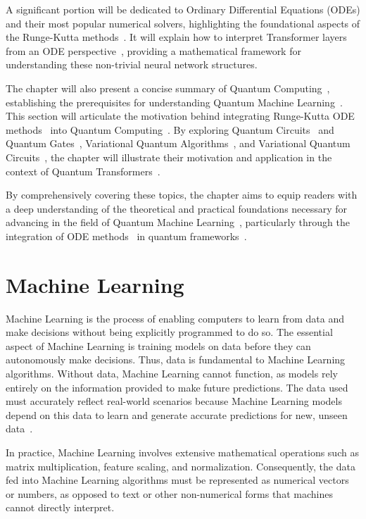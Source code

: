 \documentclass[12pt,a4paper]{report}
\begin{document}
A significant portion will be dedicated to Ordinary Differential Equations (ODEs) and their most popular numerical solvers, highlighting the foundational aspects of the Runge-Kutta methods~\cite{butcher1996history}. It will explain how to interpret Transformer layers from an ODE perspective~\cite{li2022ode}, providing a mathematical framework for understanding these non-trivial neural network structures.

The chapter will also present a concise summary of Quantum Computing~\cite{nielsen2001quantum}, establishing the prerequisites for understanding Quantum Machine Learning~\cite{dunjko2018machine}. This section will articulate the motivation behind integrating Runge-Kutta ODE methods~\cite{butcher1996history, fan2024Quantum} into Quantum Computing~\cite{nielsen2001quantum}. By exploring Quantum Circuits~\cite{benedetti2019parameterized} and Quantum Gates~\cite{barenco1995elementary}, Variational Quantum Algorithms~\cite{cerezo2021variational}, and Variational Quantum Circuits~\cite{benedetti2019parameterized}, the chapter will illustrate their motivation and application in the context of Quantum Transformers~\cite{Comajoan_Cara_2024}.

By comprehensively covering these topics, the chapter aims to equip readers with a deep understanding of the theoretical and practical foundations necessary for advancing in the field of Quantum Machine Learning~\cite{dunjko2018machine}, particularly through the integration of ODE methods~\cite{zhong2022neural} in quantum frameworks~\cite{Zhang_2023}.

\section{Machine Learning}\vspace{-12pt}
Machine Learning is the process of enabling computers to learn from data and make decisions without being explicitly programmed to do so. The essential aspect of Machine Learning is training models on data before they can autonomously make decisions. Thus, data is fundamental to Machine Learning algorithms. Without data, Machine Learning cannot function, as models rely entirely on the information provided to make future predictions. The data used must accurately reflect real-world scenarios because Machine Learning models depend on this data to learn and generate accurate predictions for new, unseen data~\cite{machinelearning}.

In practice, Machine Learning involves extensive mathematical operations such as matrix multiplication, feature scaling, and normalization. Consequently, the data fed into Machine Learning algorithms must be represented as numerical vectors or numbers, as opposed to text or other non-numerical forms that machines cannot directly interpret.
\end{document}
